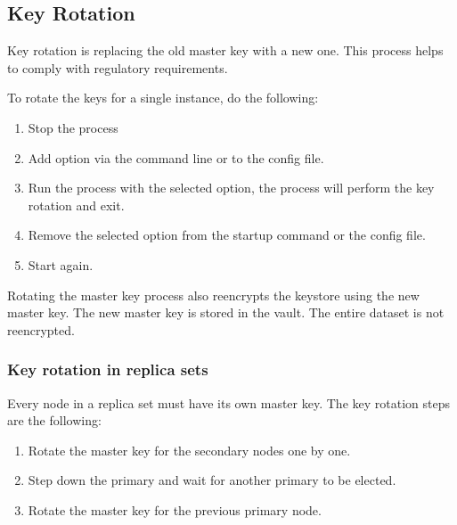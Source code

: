 \documentclass[letterpaper,10pt,english]{sphinxmanual}
\begin{document}
\subsection{Key Rotation}
\label{\detokenize{vault:key-rotation}}
\sphinxAtStartPar
Key rotation is replacing the old master key with a new one. This process helps to comply with regulatory requirements.

\sphinxAtStartPar
To rotate the keys for a single  instance, do the following:
\begin{enumerate}
%
\item {} 
\sphinxAtStartPar
Stop the  process

\item {} 
\sphinxAtStartPar
Add  option via the command line or  to the config file.

\item {} 
\sphinxAtStartPar
Run the  process with the selected option, the process will perform the key rotation and exit.

\item {} 
\sphinxAtStartPar
Remove the selected option from the startup command or the config file.

\item {} 
\sphinxAtStartPar
Start  again.

\end{enumerate}

\sphinxAtStartPar
Rotating the master key process also re\sphinxhyphen{}encrypts the keystore using the new master key. The new master key is stored in the vault. The entire dataset is not re\sphinxhyphen{}encrypted.


\subsubsection{Key rotation in replica sets}
\label{\detokenize{vault:key-rotation-in-replica-sets}}
\sphinxAtStartPar
Every  node in a replica set must have its own master key. The key rotation steps are the following:
\begin{enumerate}
%
\item {} 
\sphinxAtStartPar
Rotate the master key for the secondary nodes one by one.

\item {} 
\sphinxAtStartPar
Step down the primary and wait for another primary to be elected.

\item {} 
\sphinxAtStartPar
Rotate the master key for the previous primary node.

\end{enumerate}
\end{document}
